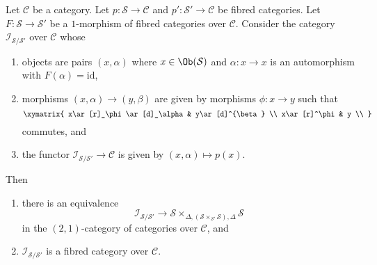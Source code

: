 \begin{lemma}
\label{lemma-inertia-fibred-category}
Let $\mathcal{C}$ be a category. Let
$p : \mathcal{S} \to \mathcal{C}$ and
$p' : \mathcal{S}' \to \mathcal{C}$ be fibred categories.
Let $F : \mathcal{S} \to \mathcal{S}'$ be a $1$-morphism of
fibred categories over $\mathcal{C}$. Consider the category
$\mathcal{I}_{\mathcal{S}/\mathcal{S}'}$ over $\mathcal{C}$ whose
\begin{enumerate}
\item objects are pairs $(x, \alpha)$ where $x \in \Ob(\mathcal{S})$
and $\alpha : x \to x$ is an automorphism with $F(\alpha) = \text{id}$,
\item morphisms $(x, \alpha) \to (y, \beta)$ are given by morphisms
$\phi : x \to y$ such that
$$
\xymatrix{
x\ar[r]_\phi\ar[d]_\alpha &
y\ar[d]^{\beta} \\
x\ar[r]^\phi &
y \\
}
$$
commutes, and
\item the functor $\mathcal{I}_{\mathcal{S}/\mathcal{S}'} \to \mathcal{C}$
is given by $(x, \alpha) \mapsto p(x)$.
\end{enumerate}
Then
\begin{enumerate}
\item there is an equivalence
$$
\mathcal{I}_{\mathcal{S}/\mathcal{S}'} \longrightarrow
\mathcal{S}
\times_{\Delta, (\mathcal{S} \times_{\mathcal{S}'} \mathcal{S}), \Delta}
\mathcal{S}
$$
in the $(2, 1)$-category of categories over $\mathcal{C}$, and
\item $\mathcal{I}_{\mathcal{S}/\mathcal{S}'}$ is a fibred category over
$\mathcal{C}$.
\end{enumerate}
\end{lemma}

